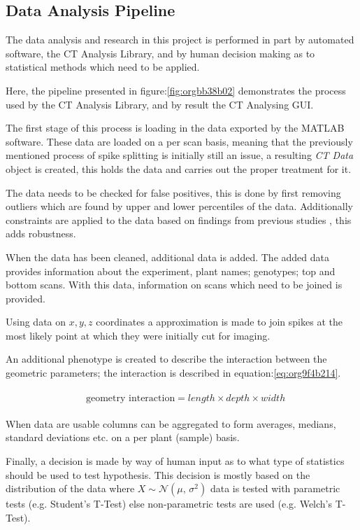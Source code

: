 \documentclass[11pt]{report}
\begin{document}
\subsection{Data Analysis Pipeline}
\label{sec:orgbc664e3}
The data analysis and research in this project is performed in part by automated software, the CT Analysis Library, and by human decision making as to statistical methods which need to be applied.

Here, the pipeline presented in figure:\ref{fig:orgbb38b02} demonstrates the process used by the CT Analysis Library, and by result the CT Analysing GUI.

The first stage of this process is loading in the data exported by the MATLAB software. These data are loaded on a per scan basis, meaning that the previously mentioned process of spike splitting is initially still an issue, a resulting \emph{CT Data} object is created, this holds the data and carries out the proper treatment for it.

The data needs to be checked for false positives, this is done by first removing outliers which are found by upper and lower percentiles of the data. Additionally constraints are applied to the data based on findings from previous studies \cite{Hughes2017}, this adds robustness.

When the data has been cleaned, additional data is added. The added data provides information about the experiment, plant names; genotypes; top and bottom scans. With this data, information on scans which need to be joined is provided.

Using data on \(x,y,z\) coordinates a approximation is made to join spikes at the most likely point at which they were initially cut for imaging.

An additional phenotype is created to describe the interaction between the geometric parameters; the interaction is described in equation:\ref{eq:org9f4b214}.

 \begin{align}
\label{eq:org9f4b214}
   &\begin{aligned}
\text{geometry interaction} = length \times depth \times width
   \end{aligned}
 \end{align}

When data are usable columns can be aggregated to form averages, medians, standard deviations etc. on a per plant (sample) basis.

Finally, a decision is made by way of human input as to what type of statistics should be used to test hypothesis. This decision is mostly based on the distribution of the data where \(X \sim \mathcal{N}(\mu,\,\sigma^{2})\) data is tested with parametric tests (e.g. Student's T-Test) else non-parametric tests are used (e.g. Welch's T-Test).
\end{document}

